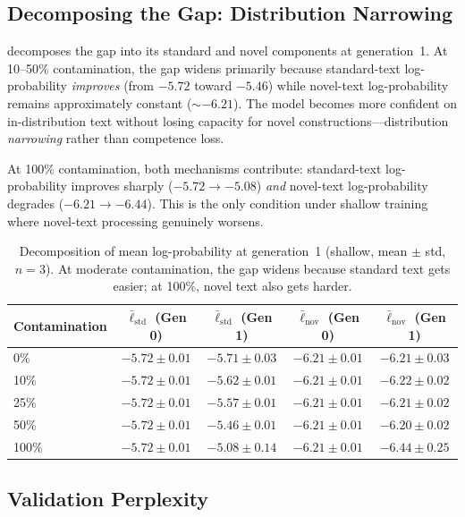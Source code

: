 \documentclass{article}
\begin{document}
\subsection{Decomposing the Gap: Distribution Narrowing}

 decomposes the gap into its standard and novel components at generation~1.
At 10--50\% contamination, the gap widens primarily because standard-text log-probability \emph{improves} (from $-5.72$ toward $-5.46$) while novel-text log-probability remains approximately constant (${\sim}{-6.21}$).
The model becomes more confident on in-distribution text without losing capacity for novel constructions---distribution \emph{narrowing} rather than competence loss.

At 100\% contamination, both mechanisms contribute: standard-text log-probability improves sharply ($-5.72 \to -5.08$) \emph{and} novel-text log-probability degrades ($-6.21 \to -6.44$).
This is the only condition under shallow training where novel-text processing genuinely worsens.

\begin{table}[htbp]
\centering
\caption{Decomposition of mean log-probability at generation~1 (shallow, mean $\pm$ std, $n{=}3$). At moderate contamination, the gap widens because standard text gets easier; at 100\%, novel text also gets harder.}
\label{tab:decomp-v2}
\begin{tabular}{lcccc}
\toprule
Contamination & $\bar{\ell}_{\text{std}}$ (Gen 0) & $\bar{\ell}_{\text{std}}$ (Gen 1) & $\bar{\ell}_{\text{nov}}$ (Gen 0) & $\bar{\ell}_{\text{nov}}$ (Gen 1) \\
\midrule
0\%   & $-5.72 \pm 0.01$ & $-5.71 \pm 0.03$ & $-6.21 \pm 0.01$ & $-6.21 \pm 0.03$ \\
10\%  & $-5.72 \pm 0.01$ & $-5.62 \pm 0.01$ & $-6.21 \pm 0.01$ & $-6.22 \pm 0.02$ \\
25\%  & $-5.72 \pm 0.01$ & $-5.57 \pm 0.01$ & $-6.21 \pm 0.01$ & $-6.21 \pm 0.02$ \\
50\%  & $-5.72 \pm 0.01$ & $-5.46 \pm 0.01$ & $-6.21 \pm 0.01$ & $-6.20 \pm 0.02$ \\
100\% & $-5.72 \pm 0.01$ & $\mathbf{-5.08 \pm 0.14}$ & $-6.21 \pm 0.01$ & $\mathbf{-6.44 \pm 0.25}$ \\
\bottomrule
\end{tabular}
\end{table}

\subsection{Validation Perplexity}
\end{document}
